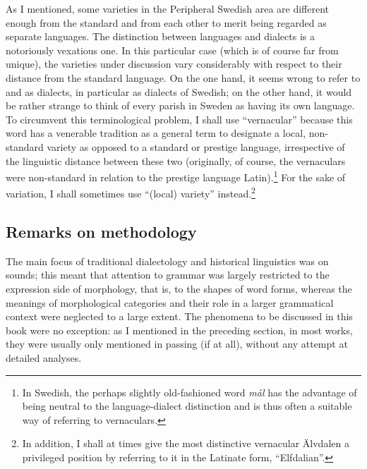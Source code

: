 As I mentioned, some varieties in the Peripheral Swedish area are different enough from the standard and from each other to merit being regarded as separate languages. The distinction between languages and dialects is a notoriously vexatious one. In this particular case (which is of course far from unique), the varieties under discussion vary considerably with respect to their distance from the standard language. On the one hand, it seems wrong to refer to  and as dialects, in particular as dialects of Swedish; on the other hand, it would be rather strange to think of every parish in Sweden as having its own language. To circumvent this terminological problem, I shall use “vernacular” because this word has a venerable tradition as a general term to designate a local, non-standard variety as opposed to a standard or prestige language, irrespective of the linguistic distance between these two (originally, of course, the vernaculars were non-standard in relation to the prestige language Latin).\footnote{ In Swedish, the perhaps slightly old-fashioned word \textit{mål} has the advantage of being neutral to the language-dialect distinction and is thus often a suitable way of referring to vernaculars. } For the sake of variation, I shall sometimes use “(local) variety” instead.\footnote{ In addition, I shall at times give the most distinctive vernacular Älvdalen a privileged position by referring to it in the Latinate form, “Elfdalian”.}

\subsection[Remarks on methodology]{\rmfamily Remarks on methodology}
The main focus of traditional dialectology and historical linguistics was on sounds; this meant that attention to grammar was largely restricted to the expression side of morphology, that is, to the shapes of word forms, whereas the meanings of morphological categories and their role in a larger grammatical context were neglected to a large extent. The phenomena to be discussed in this book were no exception: as I mentioned in the preceding section, in most works, they were usually only mentioned in passing (if at all), without any attempt at detailed analyses.

